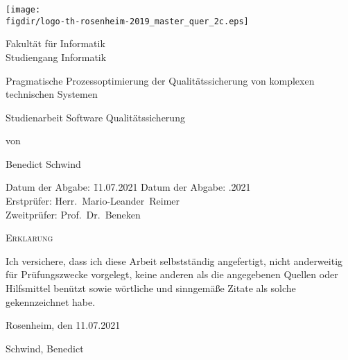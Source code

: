 \begin{titlepage}

\sffamily

\raggedleft

\vspace*{-2cm}

\texttt{[image: \\figdir/logo-th-rosenheim-2019\_master\_quer\_2c.eps]}

\vfill

\centering
\LARGE
Fakultät für Informatik  \vspace{0.5cm}\\
\Large
Studiengang Informatik

\vspace{2cm}

\LARGE

Pragmatische Prozessoptimierung der Qualitätssicherung von komplexen technischen Systemen

\vspace{2cm}

\Large
Studienarbeit Software Qualitätssicherung

\vspace{1.5cm}


\Large
von

\vspace{0.5cm}


\LARGE
Benedict Schwind \vspace{1cm}

\vspace{1cm}

\flushleft
 \Large
\vspace*{\fill}

\begin{tabbing}
Datum der Abgabe: \= 11.07.2021 \kill
Datum der Abgabe: .2021 \\
Erstprüfer: \> Herr.\ Mario-Leander\ Reimer\\
Zweitprüfer: \> Prof.\ Dr.\ Beneken
\end{tabbing}

\end{titlepage}

\cleardoubleemptypage

{
\large
\thispagestyle{empty}
\vspace*{\fill}

\noindent
\textsc{Erklärung}

\medskip

\noindent
Ich versichere, dass ich diese Arbeit selbstständig
angefertigt, nicht anderweitig für Prüfungszwecke
vorgelegt, keine anderen als die angegebenen Quellen
oder Hilfsmittel benützt sowie wörtliche und
sinngemäße Zitate als solche gekennzeichnet habe.

\bigskip

\noindent
Rosenheim, den 11.07.2021

\vspace*{2cm}

\noindent
Schwind, Benedict
}
